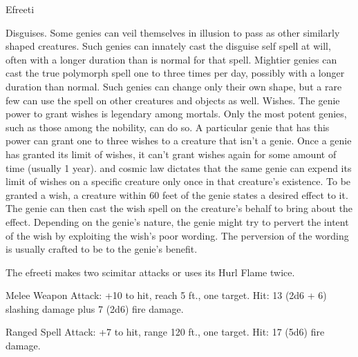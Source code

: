\begin{monsterbox}{Efreeti}
\begin{monsteraction}
Disguises.
Some genies can veil themselves in illusion to pass as other similarly shaped creatures. Such genies can innately cast the disguise self spell at will, often with a longer duration than is normal for that spell. Mightier genies can cast the true polymorph spell one to three times per day, possibly with a longer duration than normal. Such genies can change only their own shape, but a rare few can use the spell on other creatures and objects as well.
Wishes.
The genie power to grant wishes is legendary among mortals. Only the most potent genies, such as those among the nobility, can do so. A particular genie that has this power can grant one to three wishes to a creature that isn't a genie. Once a genie has granted its limit of wishes, it can't grant wishes again for some amount of time (usually 1 year). and cosmic law dictates that the same genie can expend its limit of wishes on a specific creature only once in that creature's existence.
To be granted a wish, a creature within 60 feet of the genie states a desired effect to it. The genie can then cast the wish spell on the creature's behalf to bring about the effect. Depending on the genie's nature, the genie might try to pervert the intent of the wish by exploiting the wish's poor wording. The perversion of the wording is usually crafted to be to the genie's benefit.
\end{monsteraction}
\begin{monsteraction}[Multiattack]
The efreeti makes two scimitar attacks or uses its Hurl Flame twice.
\end{monsteraction}
\begin{monsteraction}[Scimitar]
Melee Weapon Attack: +10 to hit, reach 5 ft., one target. Hit: 13 (2d6 + 6) slashing damage plus 7 (2d6) fire damage.
\end{monsteraction}
\begin{monsteraction}
Ranged Spell Attack: +7 to hit, range 120 ft., one target. Hit: 17 (5d6) fire damage.
\end{monsteraction}
\end{monsterbox}